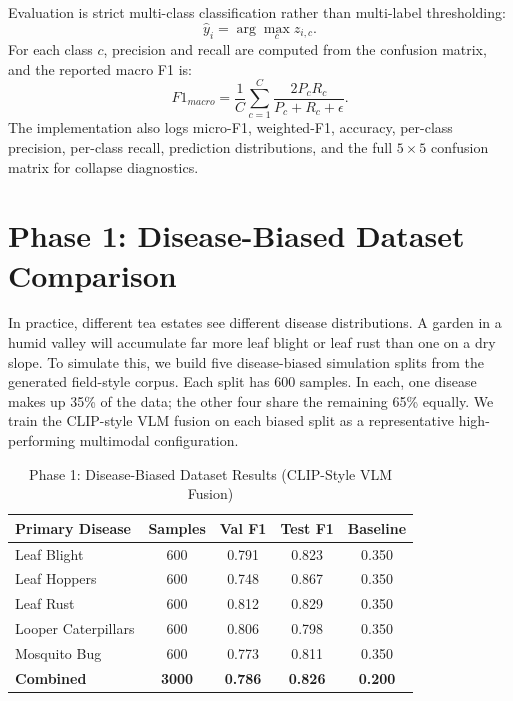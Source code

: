 \documentclass[12pt, a4paper, oneside]{Thesis}
\begin{document}
Evaluation is strict multi-class classification rather than multi-label thresholding:
\begin{equation}
  \hat{y}_i=\arg\max_c z_{i,c}.
  \label{eq:argmaxeval}
\end{equation}
For each class $c$, precision and recall are computed from the confusion matrix,
and the reported macro F1 is:
\begin{equation}
  F1_{macro}=\frac{1}{C}\sum_{c=1}^{C}
  \frac{2P_cR_c}{P_c+R_c+\epsilon}.
  \label{eq:macrof1}
\end{equation}
The implementation also logs micro-F1, weighted-F1, accuracy, per-class precision,
per-class recall, prediction distributions, and the full $5{\times}5$ confusion
matrix for collapse diagnostics.

\section{Phase 1: Disease-Biased Dataset Comparison}

In practice, different tea estates see different disease distributions. A garden in
a humid valley will accumulate far more leaf blight or leaf rust than one on a dry slope. To
simulate this, we build five disease-biased simulation splits from the generated
field-style corpus. Each split has 600 samples. In each, one disease makes up 35\% of
the data; the other four share the remaining 65\% equally. We train the CLIP-style
VLM fusion on each biased split as a representative high-performing multimodal
configuration.

\begin{table}[t]
\caption{Phase 1: Disease-Biased Dataset Results (CLIP-Style VLM Fusion)}
\label{tab:phase1}
\centering\footnotesize
\begin{tabular}{lcccc}
\toprule
\textbf{Primary Disease} & \textbf{Samples} & \textbf{Val F1} &
\textbf{Test F1} & \textbf{Baseline}\\
\midrule
Leaf Blight      & 600 & 0.791 & 0.823 & 0.350 \\
Leaf Hoppers       & 600 & 0.748 & 0.867 & 0.350 \\
Leaf Rust  & 600 & 0.812 & 0.829 & 0.350 \\
Looper Caterpillars     & 600 & 0.806 & 0.798 & 0.350 \\
Mosquito Bug    & 600 & 0.773 & 0.811 & 0.350 \\
\midrule
\textbf{Combined} & \textbf{3000} & \textbf{0.786} & \textbf{0.826} & \textbf{0.200}\\
\bottomrule
\end{tabular}
\end{table}
\end{document}
